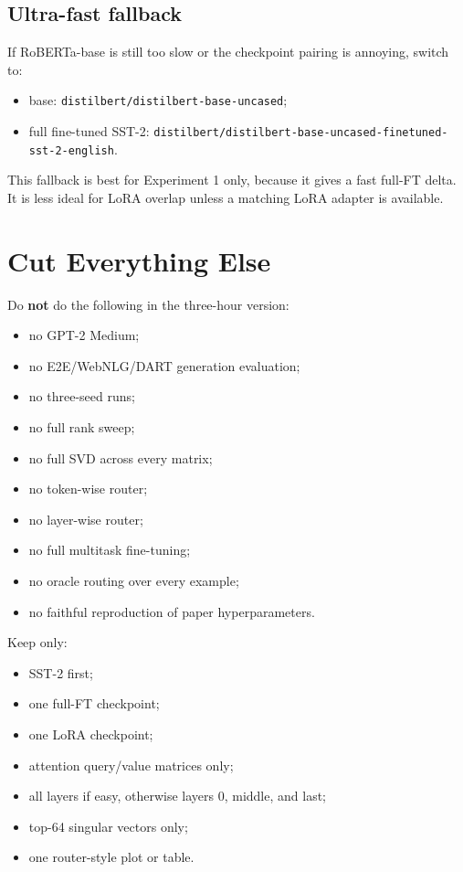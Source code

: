\documentclass[11pt]{article}
\begin{document}
\subsection{Ultra-fast fallback}

If RoBERTa-base is still too slow or the checkpoint pairing is annoying, switch to:
\begin{itemize}
    \item base: \texttt{distilbert/distilbert-base-uncased};
    \item full fine-tuned SST-2: \texttt{distilbert/distilbert-base-uncased-finetuned-sst-2-english}.
\end{itemize}

This fallback is best for Experiment 1 only, because it gives a fast full-FT delta. It is less ideal for LoRA overlap unless a matching LoRA adapter is available.

\section{Cut Everything Else}

Do \textbf{not} do the following in the three-hour version:
\begin{itemize}
    \item no GPT-2 Medium;
    \item no E2E/WebNLG/DART generation evaluation;
    \item no three-seed runs;
    \item no full rank sweep;
    \item no full SVD across every matrix;
    \item no token-wise router;
    \item no layer-wise router;
    \item no full multitask fine-tuning;
    \item no oracle routing over every example;
    \item no faithful reproduction of paper hyperparameters.
\end{itemize}

Keep only:
\begin{itemize}
    \item SST-2 first;
    \item one full-FT checkpoint;
    \item one LoRA checkpoint;
    \item attention query/value matrices only;
    \item all layers if easy, otherwise layers 0, middle, and last;
    \item top-64 singular vectors only;
    \item one router-style plot or table.
\end{itemize}
\end{document}
